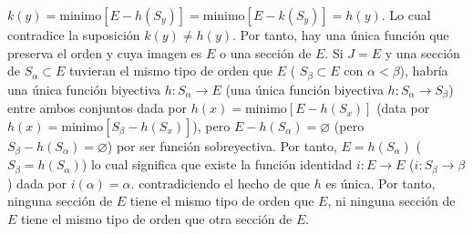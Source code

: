 \documentclass{article}
\begin{document}
$k(y)=\text{minimo}[E-h(S_y)]=\text{minimo}[E-k(S_y)]=h(y)$. Lo cual contradice la suposición $k(y)\neq h(y)$. Por tanto, hay una única función que preserva el orden y cuya imagen es $E$ o una sección de $E$. Si $J=E$ y una sección de $S_\alpha\subset E$ tuvieran el mismo tipo de orden que $E$ ( $S_\beta\subset E$ con $\alpha < \beta$), habría una única función biyectiva $h:S_\alpha\rightarrow E$ (una única función biyectiva $h:S_\alpha\rightarrow S_\beta$) entre ambos conjuntos dada por $h(x)=\text{minimo}[E-h(S_x)]$ (data por $h(x)=\text{minimo}[S_\beta-h(S_x)]$), pero $E-h(S_\alpha)=\varnothing$ (pero $S_\beta-h(S_\alpha)=\varnothing$) por ser función sobreyectiva. Por tanto, $E=h(S_\alpha)$ ($S_\beta=h(S_\alpha)$) lo cual significa que existe la función identidad $i:E\rightarrow E$ ($i:S_\beta\rightarrow \beta$) dada por $i(\alpha)=\alpha$. contradiciendo el hecho de que $h$ es única. Por tanto, ninguna sección de $E$ tiene el mismo tipo de orden que $E$, ni ninguna sección de $E$ tiene el mismo tipo de orden que otra sección de $E$.
\end{document}
